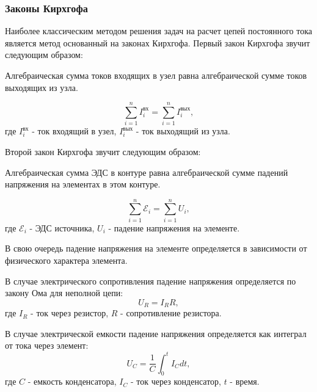 \subsubsection{Законы Кирхгофа}
Наиболее классическим методом решения задач на расчет цепей постоянного тока является метод основанный на законах Кирхгофа.
Первый закон Кирхгофа звучит следующим образом:

\begin{tcolorbox}[
    colback=white,
    colframe=black!50!black,
    title=Первый закон Кирхгофа,
    fonttitle=\bfseries,
    arc=10pt,
    boxrule=1pt
]
Алгебраическая сумма токов входящих в узел равна алгебраической сумме токов выходящих из узла.
\end{tcolorbox}
\begin{equation}
    \sum_{i=1}^{n} I_i^{\text{вх}} = \sum_{i=1}^{n} I_i^{\text{вых}},
    \label{eq:kirchhoff_laws_1}
\end{equation}
где $I_i^{\text{вх}}$ - ток входящий в узел, $I_i^{\text{вых}}$ - ток выходящий из узла.

Второй закон Кирхгофа звучит следующим образом:

\begin{tcolorbox}[
    colback=white,
    colframe=black!50!black,
    title=Второй закон Кирхгофа,
    fonttitle=\bfseries,
    arc=3pt,
    boxrule=1pt
]
Алгебраическая сумма ЭДС в контуре равна алгебраической сумме падений напряжения на элементах в этом контуре.
\end{tcolorbox}

\begin{equation}
    \sum_{i=1}^{n} \mathcal{E}_i = \sum_{i=1}^{n} U_i,
    \label{eq:kirchhoff_laws_2}
\end{equation}
где $\mathcal{E}_i$ - ЭДС источника, $U_i$ - падение напряжения на элементе.

В свою очередь падение напряжения на элементе определяется в зависимости от физического характера элемента.

В случае электрического сопротивления падение напряжения определяется по закону Ома для неполной цепи:
\begin{equation}
    U_R = I_R R,
    \label{eq:kirchhoff_laws_2_1}
\end{equation}
где $I_R$ - ток через резистор, $R$ - сопротивление резистора.

В случае электрической емкости падение напряжения определяется как интеграл от тока через элемент:
\begin{equation}
    U_C = \frac{1}{C} \int_{0}^{t} I_C dt,
    \label{eq:kirchhoff_laws_2_2}
\end{equation}
где $C$ - емкость конденсатора, $I_C$ - ток через конденсатор, $t$ - время.

